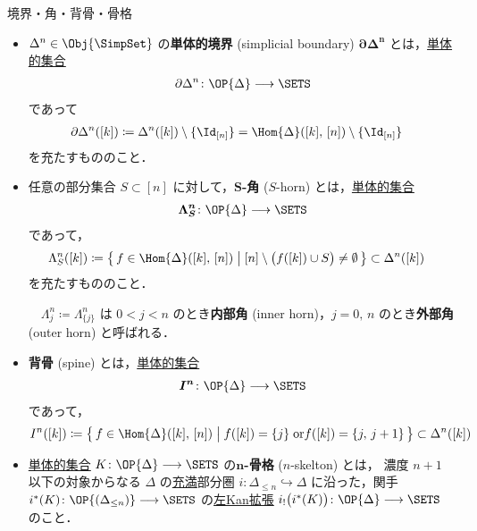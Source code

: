 \documentclass[TQFT_main]{subfiles}
\begin{document}
\begin{mydef}[label=def:horn,breakable]{境界・角・背骨・骨格}
    \begin{itemize}
        \item $\Delta^n \in \Obj{\SimpSet}$ の\textbf{単体的境界} (simplicial boundary) $\bm{\partial \Delta^n}$ とは，\hyperref[def:simplicial-sets]{単体的集合}
        \begin{align}
            \partial \Delta^n \colon \OP{\Delta} \lto \SETS
        \end{align}
        であって 
        \begin{align}
            \partial \Delta^n ([k]) &\coloneqq \Delta^n ([k]) \setminus \{\Id_{[n]}\} = \Hom{\Delta} ([k],\, [n]) \setminus \{\Id_{[n]}\}
        \end{align}
        を充たすもののこと．
        
        \item 任意の部分集合 $S \subset [n]$ に対して，\textbf{$\bm{S}$-角} ($S$-horn) とは，\hyperref[def:simplicial-sets]{単体的集合}
        \begin{align}
            \bm{\Lambda^n_S} \colon \OP{\Delta} \lto \SETS
        \end{align}
        であって，
        \begin{align}
            \Lambda^n_S ([k]) &\coloneqq \bigl\{\, f \in \Hom{\Delta} ([k],\, [n]) \bigm| [n] \setminus \bigl(f([k]) \cup S \bigr) \neq \emptyset  \,\bigr\} \subset \Delta^n([k])
        \end{align}
        を充たすもののこと．

        　$\Lambda^n_j \coloneqq \Lambda^n_{\{j\}}$ は $0 < j < n$ のとき\textbf{内部角} (inner horn)，$j = 0,\, n$ のとき\textbf{外部角} (outer horn) と呼ばれる．

        \item \textbf{背骨} (spine) とは，\hyperref[def:simplicial-sets]{単体的集合}
        \begin{align}
            \bm{I^n} \colon \OP{\Delta} \lto \SETS
        \end{align}
        であって，
        \begin{align}
            I^n ([k]) \coloneqq \bigl\{\, f \in \Hom{\Delta} ([k],\, [n]) \bigm| f([k]) = \{j\}\; \mathrm{or} f([k]) = \{j,\, j+1\} \,\bigr\} \subset \Delta^n([k])
        \end{align}
        
        \item \hyperref[def:simplicial-sets]{単体的集合} $K \colon \OP{\Delta} \lto \SETS$ の\textbf{$\bm{n}$-骨格} ($n$-skelton) とは，
        濃度 $n+1$ 以下の対象からなる $\Delta$ の\hyperref[def:faithful]{充満}部分圏 $i \colon \Delta_{\le n} \hookrightarrow \Delta$ に沿った，関手 $i^*(K) \colon \OP{(\Delta_{\le n})} \lto \SETS$ の\hyperref[def:Kanext]{左Kan拡張} $i_! \bigl(i^* (K)\bigr) \colon \OP{\Delta} \lto \SETS$ のこと．


\end{itemize}
\end{mydef}
\end{document}
